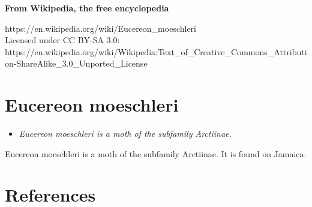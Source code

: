 \textbf{From Wikipedia, the free encyclopedia}

https://en.wikipedia.org/wiki/Eucereon\_moeschleri\\
Licensed under CC BY-SA 3.0:\\
https://en.wikipedia.org/wiki/Wikipedia:Text\_of\_Creative\_Commons\_Attribution-ShareAlike\_3.0\_Unported\_License

\section{Eucereon moeschleri}\label{eucereon-moeschleri}

\begin{itemize}
\item
  \emph{Eucereon moeschleri is a moth of the subfamily Arctiinae.}
\end{itemize}

Eucereon moeschleri is a moth of the subfamily Arctiinae. It is found on
Jamaica.

\section{References}\label{references}
